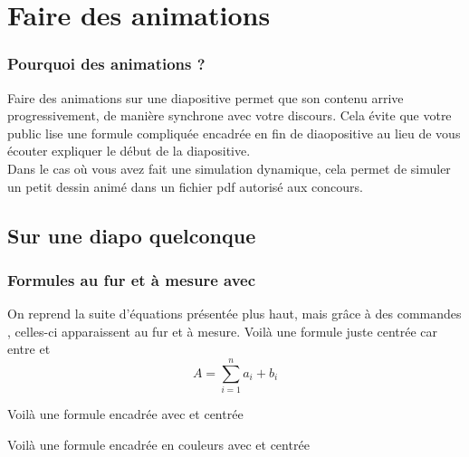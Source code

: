 \section{Faire des animations}

\begin{frame}
  \frametitle{Pourquoi des animations ?}
  
  \begin{itemize}
   \flch Faire des animations sur une diapositive permet que son contenu arrive progressivement, de manière synchrone avec votre discours.
  Cela évite que votre public lise une formule compliquée encadrée en fin de diaopositive au lieu de vous écouter expliquer le début de la diapositive.\\
  \flch Dans le cas où vous avez fait une simulation dynamique, cela permet de simuler un petit dessin animé dans un fichier pdf autorisé aux concours.
  \end{itemize}
\end{frame}

\subsection{Sur une diapo quelconque}


\begin{frame}
	\frametitle{Formules au fur et à mesure avec \lin{\pause}}
	On reprend la suite d'équations présentée plus haut, mais grâce à des commandes \lin{\pause}, celles-ci apparaissent au fur et à mesure.
	\pause
	Voilà une formule juste centrée car entre \lin{$$} et \lin{$$} 
	$$ A  = \sum_{i=1}^{n} a_i +b_i$$
	
	\pause
	Voilà une formule encadrée avec \lin{\fbox}et centrée 
	\begin{center}
	\end{center}
	\pause
	
	Voilà une formule encadrée en couleurs avec \lin{\fcolorbox} et centrée
	\begin{center}
	\end{center}
\end{frame}

